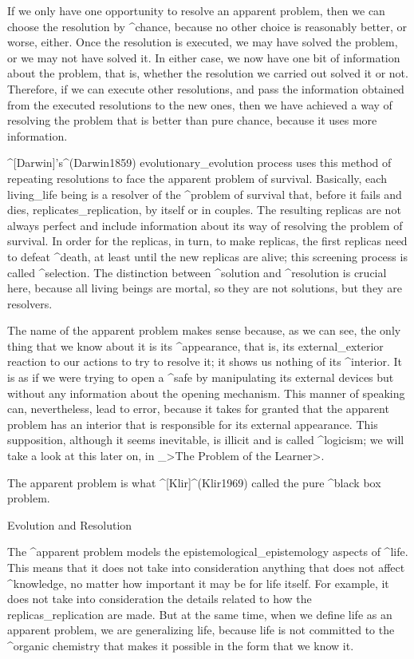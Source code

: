 If we only have one opportunity to resolve an apparent problem, then we
can choose the resolution by ^{chance}, because no other choice is
reasonably better, or worse, either. Once the resolution is executed, we
may have solved the problem, or we may not have solved it. In either
case, we now have one bit of information about the problem, that is,
whether the resolution we carried out solved it or not. Therefore, if we
can execute other resolutions, and pass the information obtained from
the executed resolutions to the new ones, then we have achieved a way of
resolving the problem that is better than pure chance, because it uses
more information.

^[Darwin]'s^(Darwin1859) evolutionary_{evolution} process uses this
method of repeating resolutions to face the apparent problem of
survival. Basically, each living_{life} being is a resolver of the
^{problem of survival} that, before it fails and dies,
replicates_{replication}, by itself or in couples. The resulting
replicas are not always perfect and include information about its way of
resolving the problem of survival. In order for the replicas, in turn,
to make replicas, the first replicas need to defeat ^{death}, at least
until the new replicas are alive; this screening process is called
^{selection}. The distinction between ^{solution} and ^{resolution} is
crucial here, because all living beings are mortal, so they are not
solutions, but they are resolvers.

The name of the apparent problem makes sense because, as we can see, the
only thing that we know about it is its ^{appearance}, that is, its
external_{exterior} reaction to our actions to try to resolve it; it
shows us nothing of its ^{interior}. It is as if we were trying to open
a ^{safe} by manipulating its external devices but without any
information about the opening mechanism. This manner of speaking can,
nevertheless, lead to error, because it takes for granted that the
apparent problem has an interior that is responsible for its external
appearance. This supposition, although it seems inevitable, is illicit
and is called ^{logicism}; we will take a look at this later on, in
_>The Problem of the Learner>.

The apparent problem is what ^[Klir]^(Klir1969) called the pure ^{black
box} problem.


\Section Evolution and Resolution

The ^{apparent problem} models the epistemological_{epistemology}
aspects of ^{life}. This means that it does not take into consideration
anything that does not affect ^{knowledge}, no matter how important it
may be for life itself. For example, it does not take into consideration
the details related to how the replicas_{replication} are made. But at
the same time, when we define life as an apparent problem, we are
generalizing life, because life is not committed to the ^{organic
chemistry} that makes it possible in the form that we know it.

